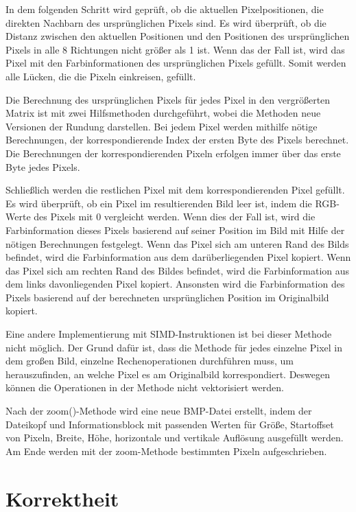\documentclass[course=erap]{aspdoc}
\begin{document}
    In dem folgenden Schritt wird geprüft, ob die aktuellen Pixelpositionen, die direkten Nachbarn des ursprünglichen Pixels sind.
    Es wird überprüft, ob die Distanz zwischen den aktuellen Positionen und den Positionen des ursprünglichen Pixels in alle 8 Richtungen
    nicht größer als 1 ist. Wenn das der Fall ist, wird das Pixel mit den Farbinformationen des ursprünglichen Pixels gefüllt.
    Somit werden alle Lücken, die die Pixeln einkreisen, gefüllt.

    Die Berechnung des ursprünglichen Pixels für jedes Pixel in den vergrößerten Matrix ist mit zwei Hilfsmethoden durchgeführt,
    wobei die Methoden neue Versionen der Rundung darstellen. Bei jedem Pixel werden mithilfe nötige Berechnungen, der korrespondierende
    Index der ersten Byte des Pixels berechnet. Die Berechnungen der korrespondierenden Pixeln erfolgen immer über das erste Byte jedes Pixels.

    Schließlich werden die restlichen Pixel mit dem korrespondierenden Pixel gefüllt. Es wird überprüft, ob ein Pixel im resultierenden
    Bild leer ist, indem die RGB-Werte des Pixels mit 0 vergleicht werden. Wenn dies der Fall ist, wird die Farbinformation dieses Pixels
    basierend auf seiner Position im Bild mit Hilfe der nötigen Berechnungen festgelegt. Wenn das Pixel sich am unteren Rand des Bilds
    befindet, wird die Farbinformation aus dem darüberliegenden Pixel kopiert. Wenn das Pixel sich am rechten Rand des Bildes befindet,
    wird die Farbinformation aus dem links davonliegenden Pixel kopiert. Ansonsten wird die Farbinformation des Pixels basierend auf der
    berechneten ursprünglichen Position im Originalbild kopiert.

    Eine andere Implementierung mit SIMD-Instruktionen ist bei dieser Methode nicht möglich. Der Grund dafür ist, dass die Methode für
    jedes einzelne Pixel in dem großen Bild, einzelne Rechenoperationen durchführen muss, um herauszufinden, an welche Pixel es am Originalbild
    korrespondiert. Deswegen können die Operationen in der Methode nicht vektorisiert werden.

    Nach der zoom()-Methode wird eine neue BMP-Datei erstellt, indem der Dateikopf und Informationsblock mit passenden Werten für Größe,
    Startoffset von Pixeln, Breite, Höhe, horizontale und vertikale Auflösung ausgefüllt werden. Am Ende werden mit der zoom-Methode
    bestimmten Pixeln aufgeschrieben.


    \section{Korrektheit}
\end{document}

